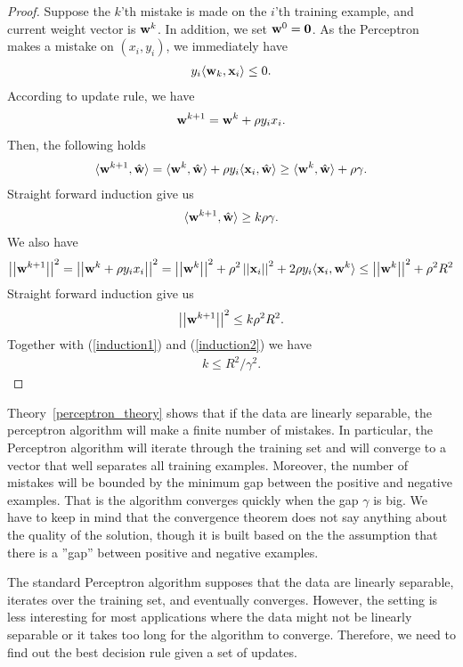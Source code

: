 {\begin{proof}
	Suppose the $k$'th mistake is made on the $i$'th training example, and current weight vector is $\mathbf {w}^k$.
	In addition, we set $\mathbf {w}^0=\mathbf {0}$.
	As the Perceptron makes a mistake on $(x_i,y_i)$, we immediately have
	\begin{align*}
		y_i\langle \mathbf {w}_k, \mathbf {x}_i \rangle \le 0.
	\end{align*}
	According to update rule, we have
	\begin{align*}
		\mathbf {w}^{k+1} = \mathbf {w}^{k} + \rho y_ix_i.
	\end{align*}
	Then, the following holds
	\begin{align*}
		\langle \mathbf {w}^{k+1}, \hat{\mathbf {w}} \rangle = \langle \mathbf {w}^k, \hat{\mathbf {w}} \rangle + \rho y_i\langle \mathbf {x}_i, \hat{\mathbf {w}} \rangle \ge \langle \mathbf {w}^k, \hat{\mathbf {w}} \rangle + \rho\gamma.
	\end{align*}
	Straight forward induction give us
	\begin{align}
		\langle \mathbf {w}^{k+1}, \hat{\mathbf {w}} \rangle\ge k\rho\gamma. \label{induction1}
	\end{align}
	We also have
	\begin{align*}
		\left|\left| \mathbf {w}^{k+1} \right|\right|^2 
		= \left|\left| \mathbf {w}^{k} + \rho y_ix_i \right|\right|^2
		= \left|\left| \mathbf {w}^k \right|\right|^2 + \rho^2\left|\left| \mathbf {x}_i \right|\right|^2 + 2\rho y_i\langle \mathbf {x}_i, \mathbf {w}^k \rangle
		\le \left|\left| \mathbf {w}^k \right|\right|^2 + \rho^2R^2
	\end{align*}
	Straight forward induction give us
	\begin{align}
		\left|\left| \mathbf {w}^{k+1} \right|\right|^2\le k\rho^2R^2. \label{induction2}
	\end{align}
	Together with (\ref{induction1}) and (\ref{induction2}) we have
	\begin{align*}
		k\le{R^2}/{\gamma^2}.
	\end{align*}
\end{proof}
Theory~\ref{perceptron_theory} shows that if the data are linearly separable, the perceptron algorithm will make a finite number of mistakes. 
In particular, the Perceptron algorithm will iterate through the training set and will converge to a vector that well separates all training examples.
Moreover, the number of mistakes will be bounded by the minimum gap between the positive and negative examples.
That is the algorithm converges quickly when the gap $\gamma$ is big.
We have to keep in mind that the convergence theorem does not say anything about the quality of the solution, though it is built based on the the assumption that there is a ''gap'' between positive and negative examples.

The standard Perceptron algorithm supposes that the data are linearly separable, iterates over the training set, and eventually converges.
However, the setting is less interesting for most applications where the data might not be linearly separable or it takes too long for the algorithm to converge.
Therefore, we need to find out the best decision rule given a set of updates.

}
